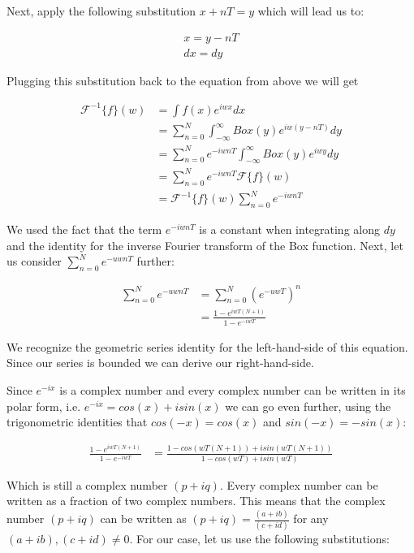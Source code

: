 Next, apply the following substitution $x+nT = y$ which will lead us to:

\begin{gather*}
x=y-nT\\
dx=dy
\end{gather*} 

Plugging this substitution back to the equation from above we will get 

\begin{align*}
\mathcal{F}^{-1}\{f\}(w)
& =\int f(x) e^{iwx}dx\\
& =\sum_{n=0}^{N} \int_{-\infty}^{\infty} Box(y) e^{iw(y-nT)}dy \\
& =\sum_{n=0}^{N} e^{-iwnT} \int_{-\infty}^{\infty} Box(y) e^{iwy}dy \\
& =\sum_{n=0}^{N} e^{-iwnT} \mathcal{F}\{f\}(w) \\
& =\mathcal{F}^{-1}\{f\}(w) \sum_{n=0}^{N} e^{-iwnT}  
\end{align*}

We used the fact that the term $e^{-iwnT}$ is a constant when integrating along $dy$ and the identity for the inverse Fourier transform of the Box function. Next, let us consider $\sum_{n=0}^N e^{-uwnT}$ further:

\begin{align*}
\sum_{n=0}^N e^{-uwnT}
& =\sum_{n=0}^N (e^{-uwT})^n \\
& =\frac{1-e^{iwT(N+1)}}{1-e^{-iwT}}
\end{align*}

We recognize the geometric series identity for the left-hand-side of this equation. Since our series is bounded we can derive our right-hand-side.

Since $e^{-ix}$ is a complex number and every complex number can be written in its polar form, i.e. $e^{-ix} = cos(x) + i sin(x)$ we can go even further, using the trigonometric identities that $cos(-x) = cos(x)$ and $sin(-x) = -sin(x)$:

\begin{align*}
\frac{1-e^{iwT(N+1)}}{1-e^{-iwT}}
& =\frac{1-cos(wT(N+1)) + i sin(wT(N+1)) }{1-cos(wT) + i sin(wT)}
\end{align*}

Which is still a complex number $(p+iq)$. Every complex number can be written as a fraction of two complex numbers. This means that the complex number $(p+iq)$ can be written as $(p+iq) = \frac{(a+ib)}{(c+id)}$ for any $(a+ib), (c+id) \neq 0$. 
For our case, let us use the following substitutions: 


